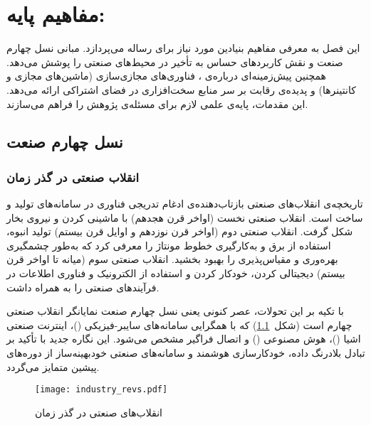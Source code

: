 
\chapter{مفاهیم پایه:}\label{chap:pre}

این فصل به معرفی مفاهیم بنیادین مورد نیاز برای رساله می‌پردازد. مبانی نسل چهارم صنعت و نقش کاربردهای حساس به تأخیر در محیط‌های صنعتی را پوشش می‌دهد. همچنین پیش‌زمینه‌ای درباره‌ی ، فناوری‌های مجازی‌سازی (ماشین‌های مجازی و کانتینرها) و پدیده‌ی رقابت بر سر منابع سخت‌افزاری در فضای اشتراکی ارائه می‌دهد. این مقدمات، پایه‌ی علمی لازم برای مسئله‌ی پژوهش را فراهم می‌سازند.

\section{نسل چهارم صنعت}
\subsection{انقلاب صنعتی در گذر زمان}

تاریخچه‌ی انقلاب‌های صنعتی بازتاب‌دهنده‌ی ادغام تدریجی فناوری در سامانه‌های تولید و ساخت است. انقلاب صنعتی نخست (اواخر قرن هجدهم) با ماشینی کردن و نیروی بخار شکل گرفت. انقلاب صنعتی دوم (اواخر قرن نوزدهم و اوایل قرن بیستم) تولید انبوه، استفاده از برق و به‌کارگیری خطوط مونتاژ را معرفی کرد که به‌طور چشمگیری بهره‌وری و مقیاس‌پذیری را بهبود بخشید. انقلاب صنعتی سوم (میانه تا اواخر قرن بیستم) دیجیتالی‌ کردن، خودکار کردن و استفاده از الکترونیک و فناوری اطلاعات در فرآیندهای صنعتی را به همراه داشت\cite{Zhou2015Industry4}.

با تکیه بر این تحولات، عصر کنونی یعنی نسل چهارم صنعت نمایانگر انقلاب صنعتی چهارم است (شکل~\ref{figure:4IR_Revs}) که با همگرایی سامانه‌های سایبر-فیزیکی ()، اینترنت صنعتی اشیا ()، هوش مصنوعی () و اتصال فراگیر مشخص می‌شود\cite{Aceto2019Survey}. این نگاره جدید با تأکید بر تبادل بلادرنگ داده، خودکارسازی هوشمند و سامانه‌های صنعتی خودبهینه‌ساز از دوره‌های پیشین متمایز می‌گردد.

\vspace{0.5cm}
\begin{figure}[h]
\centering
\texttt{[image: industry\_revs.pdf]}
\caption{انقلاب‌های صنعتی در گذر زمان\cite{Aceto2019Survey}}
\label{figure:4IR_Revs}
\end{figure}
\vspace{0.5cm}

